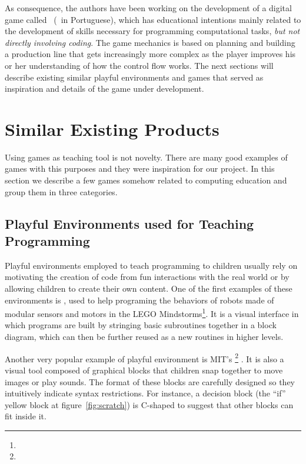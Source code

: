 \documentclass{sigchi}
\begin{document}
    As consequence, the authors have been working on the development of a
    digital game called \gamename~(\gamenamept~in Portuguese), which has
    educational intentions mainly related to the development of skills necessary
    for programming computational tasks, \textit{but not directly involving
    coding}. The game mechanics is based on planning and building a production
    line that gets increasingly more complex as the player improves his or her
    understanding of how the control flow works. The next sections will describe
    existing similar playful environments and games that served as inspiration
    and details of the game under development.

\section{Similar Existing Products}
    Using games as teaching tool is not novelty. There are many good examples of
    games with this purposes and they were inspiration for our project. In this
    section we describe a few games somehow related to computing education and
    group them in three categories.

    \subsection{Playful Environments used for Teaching Programming}
        Playful environments employed to teach programming to children usually
        rely on motivating the creation of code from fun interactions with the
        real world or by allowing children to create their own content. One of
        the first examples of these environments is \labview \cite{Erwin2000},
        used to help programing the behaviors of robots made of modular sensors
        and motors in the LEGO Mindstorms\footnote{\mindstormsite}. It is a
        visual interface in which programs are built by stringing basic
        subroutines together in a block diagram, which can then be further
        reused as a new routines in higher levels.

        Another very popular example of playful environment is MIT's
        \scratch\footnote{\scratchsite} \cite{Resnick2009}. It is also a visual
        tool composed of graphical blocks that children snap together to move
        images or play sounds. The format of these blocks are carefully designed
        so they intuitively indicate syntax restrictions. For instance, a
        decision block (the ``if'' yellow block at figure~\ref{fig:scratch}) is
        C-shaped to suggest that other blocks can fit inside it.
\end{document}
